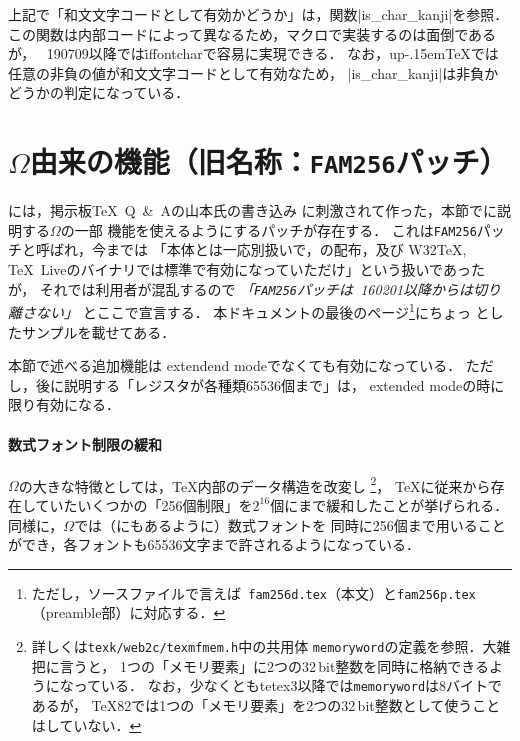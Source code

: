 \documentclass[a4paper,11pt,nomag]{jsarticle}
\newcommand{\OMEGA}{\texorpdfstring{$\Omega$}{Ω}}
\def\upTeX{u\pTeX}\def\pTeX{p\kern-.15em\TeX}
\begin{document}
\begin{dangerous}
  上記で「和文文字コードとして有効かどうか」は，関数|is_char_kanji|を参照．
  この関数は内部コードによって異なるため，マクロで実装するのは面倒であるが，
  \epTeX~190709以降では\.{iffontchar}で容易に実現できる．
  なお，\upTeX では任意の非負の値が和文文字コードとして有効なため，
  |is_char_kanji|は非負かどうかの判定になっている．
\end{dangerous}

\section{\OMEGA 由来の機能（旧名称：\texttt{FAM256}パッチ）}
\epTeX には，掲示板\TeX\ Q\ \&\ Aの山本氏の書き込み
\cite{yamamoto}に刺激されて作った，本節でに説明する\OMEGA の一部
機能を使えるようにするパッチが存在する．
これは\texttt{FAM256}パッチと呼ばれ，今までは
「\epTeX 本体とは一応別扱いで，\epTeX の配布，及び
W32\TeX, \TeX~Liveのバイナリでは標準で有効になっていただけ」という扱いであったが，
それでは利用者が混乱するので
\emph{「\texttt{FAM256}パッチは\epTeX~160201以降からは切り離さない」}
とここで宣言する．
本ドキュメントの最後のページ\footnote{ただし，ソースファイルで言えば{\tt
fam256d.tex}（本文）と\texttt{fam256p.tex}（preamble部）に対応する．}にちょっ
としたサンプルを載せてある．

本節で述べる追加機能は extendend modeでなくても有効になっている．
ただし，後に説明する「レジスタが各種類65536個まで」は，
extended modeの時に限り有効になる．

\paragraph{数式フォント制限の緩和}
\OMEGA の大きな特徴としては，\TeX 内部のデータ構造を改変し
\footnote{詳しくは\texttt{texk/web2c/texmfmem.h}中の共用体%
\texttt{memoryword}の定義を参照．大雑把に言うと，
1つの「メモリ要素」に2つの32\,bit整数を同時に格納できるようになっている．
なお，少なくともtetex3以降では\texttt{memoryword}は8バイトであるが，
\TeX 82では1つの「メモリ要素」を2つの32\,bit整数として使うことはしていない．
}，
\TeX に従来から存在していたいくつかの「256個制限」を$2^{16}$個にまで緩和したことが挙げられる．
同様に，\OMEGA では（\cite{yamamoto}にもあるように）数式フォントを
同時に256個まで用いることができ，各フォントも65536文字まで許されるようになっている．

\medskip
\end{document}
